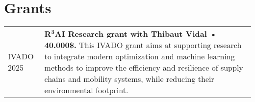 \section{Grants}

\begin{longtable}[l]{@{}p{}p{}}
    IVADO 2025 & \textbf{R${}^\textbf{3}$AI Research grant with Thibaut Vidal • 40.000\$.} This IVADO grant aims at supporting research to integrate modern optimization and machine learning methods to improve the efficiency and resilience of supply chains and mobility systems, while reducing their environmental footprint.
\end{longtable}
